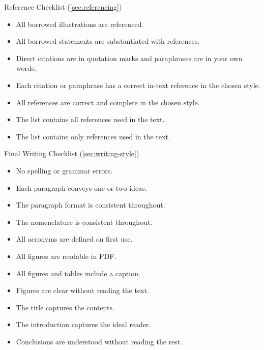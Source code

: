 \documentclass[../main.tex]{subfiles}
\begin{document}
\begin{checklistbox}{Reference Checklist \quad (\autoref{sec:referencing})}
\begin{itemize}[leftmargin=2em]
  \item[\(\square\)] All borrowed illustrations are referenced.
  \item[\(\square\)] All borrowed statements are substantiated with references.
  \item[\(\square\)] Direct citations are in quotation marks and paraphrases are in your own words.
  \item[\(\square\)] Each citation or paraphrase has a correct in-text reference in the chosen style.
  \item[\(\square\)] All references are correct and complete in the chosen style.
  \item[\(\square\)] The list contains all references used in the text.
  \item[\(\square\)] The list contains only references used in the text.
\end{itemize}
\end{checklistbox}

\begin{checklistbox}{Final Writing Checklist \quad (\autoref{sec:writing-style})}
\begin{itemize}[leftmargin=2em]
  \item[\(\square\)] No spelling or grammar errors.
  \item[\(\square\)] Each paragraph conveys one or two ideas.
  \item[\(\square\)] The paragraph format is consistent throughout.
  \item[\(\square\)] The nomenclature is consistent throughout.
  \item[\(\square\)] All acronyms are defined on first use.
  \item[\(\square\)] All figures are readable in PDF.
  \item[\(\square\)] All figures and tables include a caption.
  \item[\(\square\)] Figures are clear without reading the text.
  \item[\(\square\)] The title captures the contents.
  \item[\(\square\)] The introduction captures the ideal reader.
  \item[\(\square\)] Conclusions are understood without reading the rest.
\end{itemize}
\end{checklistbox}
\end{document}
